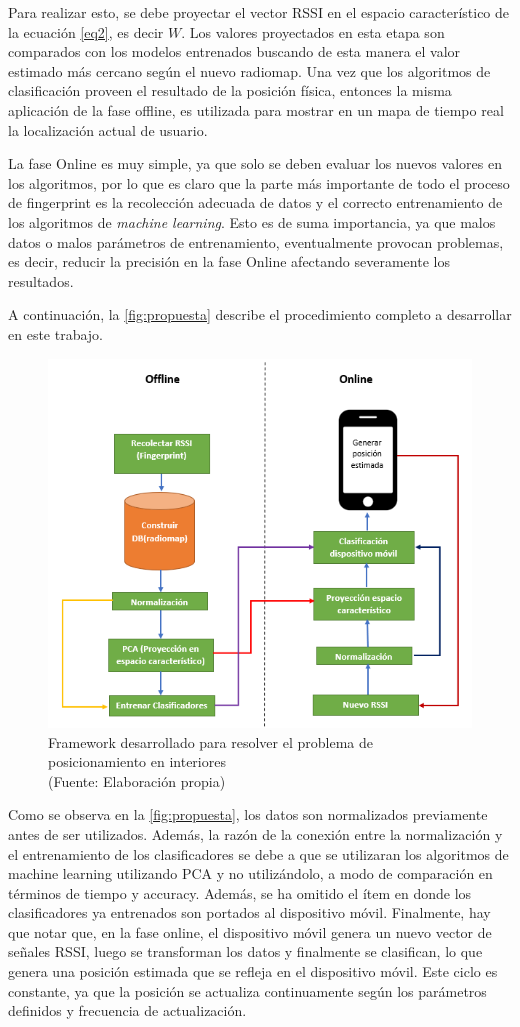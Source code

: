 Para realizar esto, se debe proyectar el vector RSSI en el espacio característico de la ecuación \ref{eq2}, es decir $W$. Los valores proyectados en esta etapa son comparados con los modelos entrenados buscando de esta manera el valor estimado más cercano según el nuevo radiomap. Una vez que los algoritmos de clasificación proveen el resultado de la posición física, entonces la misma aplicación de la fase offline, es utilizada para mostrar en un mapa de tiempo real la localización actual de usuario.

La fase Online es muy simple, ya que solo se deben evaluar los nuevos valores en los algoritmos, por lo que es claro que la parte más importante de todo el proceso de fingerprint es la recolección adecuada de datos y el correcto entrenamiento de los algoritmos de \textit{machine learning}. Esto es de suma importancia, ya que malos datos o malos parámetros de entrenamiento, eventualmente provocan problemas, es decir, reducir la precisión en la fase Online afectando severamente los resultados.

A continuación, la \autoref{fig:propuesta} describe el procedimiento completo a desarrollar en este trabajo.

\newpage

\begin{figure}[ht!]
\centering
\includegraphics[width=.6\textwidth]{figures/propuesta_memoria.png}
\caption[Framework desarrollado para posicionamiento indoor]{Framework desarrollado para resolver el problema de posicionamiento en interiores\\
{\scriptsize (Fuente: Elaboración propia)}}
\label{fig:propuesta}
\end{figure}

Como se observa en la \autoref{fig:propuesta}, los datos son normalizados previamente antes de ser utilizados. Además, la razón de la conexión entre la normalización y el entrenamiento de los clasificadores se debe a que se utilizaran los algoritmos de machine learning utilizando PCA y no utilizándolo, a modo de comparación en términos de tiempo y accuracy. Además, se ha omitido el ítem en donde los clasificadores ya entrenados son portados al dispositivo móvil. Finalmente, hay que notar que, en la fase online, el dispositivo móvil genera un nuevo vector de señales RSSI, luego se transforman los datos y finalmente se clasifican, lo que genera una posición estimada que se refleja en el dispositivo móvil. Este ciclo es constante, ya que la posición se actualiza continuamente según los parámetros definidos y frecuencia de actualización.
